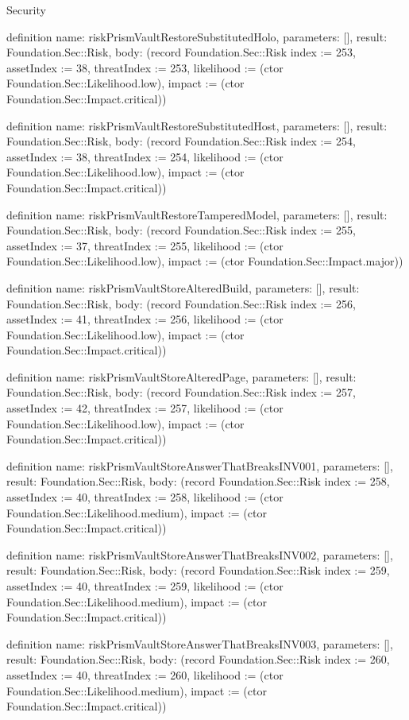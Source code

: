 \begin{lexlean}{Security}
\begin{semanticmodule}
definition{
  name: riskPrismVaultRestoreSubstitutedHolo,
  parameters: [],
  result: Foundation.Sec::Risk,
  body: (record Foundation.Sec::Risk {index := 253, assetIndex := 38, threatIndex := 253, likelihood := (ctor Foundation.Sec::Likelihood.low), impact := (ctor Foundation.Sec::Impact.critical)})
}

definition{
  name: riskPrismVaultRestoreSubstitutedHost,
  parameters: [],
  result: Foundation.Sec::Risk,
  body: (record Foundation.Sec::Risk {index := 254, assetIndex := 38, threatIndex := 254, likelihood := (ctor Foundation.Sec::Likelihood.low), impact := (ctor Foundation.Sec::Impact.critical)})
}

definition{
  name: riskPrismVaultRestoreTamperedModel,
  parameters: [],
  result: Foundation.Sec::Risk,
  body: (record Foundation.Sec::Risk {index := 255, assetIndex := 37, threatIndex := 255, likelihood := (ctor Foundation.Sec::Likelihood.low), impact := (ctor Foundation.Sec::Impact.major)})
}

definition{
  name: riskPrismVaultStoreAlteredBuild,
  parameters: [],
  result: Foundation.Sec::Risk,
  body: (record Foundation.Sec::Risk {index := 256, assetIndex := 41, threatIndex := 256, likelihood := (ctor Foundation.Sec::Likelihood.low), impact := (ctor Foundation.Sec::Impact.critical)})
}

definition{
  name: riskPrismVaultStoreAlteredPage,
  parameters: [],
  result: Foundation.Sec::Risk,
  body: (record Foundation.Sec::Risk {index := 257, assetIndex := 42, threatIndex := 257, likelihood := (ctor Foundation.Sec::Likelihood.low), impact := (ctor Foundation.Sec::Impact.critical)})
}

definition{
  name: riskPrismVaultStoreAnswerThatBreaksINV001,
  parameters: [],
  result: Foundation.Sec::Risk,
  body: (record Foundation.Sec::Risk {index := 258, assetIndex := 40, threatIndex := 258, likelihood := (ctor Foundation.Sec::Likelihood.medium), impact := (ctor Foundation.Sec::Impact.critical)})
}

definition{
  name: riskPrismVaultStoreAnswerThatBreaksINV002,
  parameters: [],
  result: Foundation.Sec::Risk,
  body: (record Foundation.Sec::Risk {index := 259, assetIndex := 40, threatIndex := 259, likelihood := (ctor Foundation.Sec::Likelihood.medium), impact := (ctor Foundation.Sec::Impact.critical)})
}

definition{
  name: riskPrismVaultStoreAnswerThatBreaksINV003,
  parameters: [],
  result: Foundation.Sec::Risk,
  body: (record Foundation.Sec::Risk {index := 260, assetIndex := 40, threatIndex := 260, likelihood := (ctor Foundation.Sec::Likelihood.medium), impact := (ctor Foundation.Sec::Impact.critical)})
}


\end{semanticmodule}
\end{lexlean}
